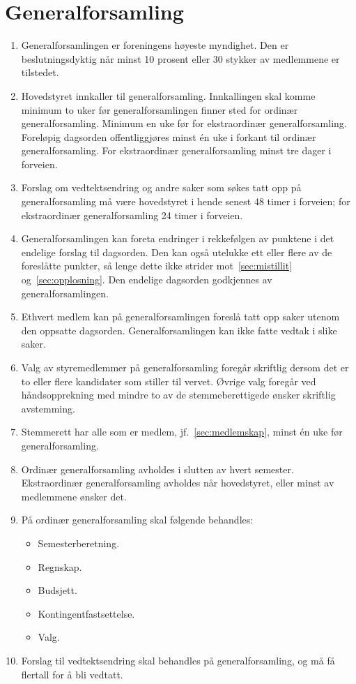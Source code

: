 \documentclass[8pt,norsk,a4paper]{article}
\begin{document}
\section{Generalforsamling}
\begin{enumerate}
	\item{Generalforsamlingen er foreningens høyeste myndighet. Den er beslutningsdyktig når minst 10 prosent eller 30 stykker av medlemmene er tilstedet.}
	\item{Hovedstyret innkaller til generalforsamling. Innkallingen skal komme minimum to uker før generalforsamlingen finner sted for ordinær generalforsamling. Minimum en uke før for ekstraordinær generalforsamling. Foreløpig dagsorden offentliggjøres minst én uke i forkant til ordinær generalforsamling. For ekstraordinær generalforsamling minst tre dager i forveien.}
	\item{Forslag om vedtektsendring og andre saker som søkes tatt opp på generalforsamling må være hovedstyret i hende senest 48 timer i forveien; for ekstraordinær generalforsamling 24 timer i forveien.}
	\item{Generalforsamlingen kan foreta endringer i rekkefølgen av punktene i det endelige forslag til dagsorden. Den kan også utelukke ett eller flere av de foreslåtte punkter, så lenge dette ikke strider mot~\ref{sec:mistillit} og~\ref{sec:opplosning}. Den endelige dagsorden godkjennes av generalforsamlingen.}
	\item{Ethvert medlem kan på generalforsamlingen foreslå tatt opp saker utenom den oppsatte dagsorden. Generalforsamlingen kan ikke fatte vedtak i slike saker.}
	\item{Valg av styremedlemmer på generalforsamling foregår skriftlig dersom det er to eller flere kandidater som stiller til vervet. Øvrige valg foregår ved håndsopprekning med mindre to av de stemmeberettigede ønsker skriftlig avstemming.}
	\item{Stemmerett har alle som er medlem, jf.~\ref{sec:medlemskap}, minst én uke før generalforsamling.}
	\item{Ordinær generalforsamling avholdes i slutten av hvert semester. Ekstraordinær generalforsamling avholdes når hovedstyret, eller minst  av medlemmene ønsker det.}
	\item{På ordinær generalforsamling skal følgende behandles:}
	\begin{itemize}
		\item{Semesterberetning.}
		\item{Regnskap.}
		\item{Budsjett.}
		\item{Kontingentfastsettelse.}
		\item{Valg.}
	\end{itemize}
	\item{Forslag til vedtektsendring skal behandles på generalforsamling, og må få  flertall for å bli vedtatt.}
\end{enumerate}
\end{document}
